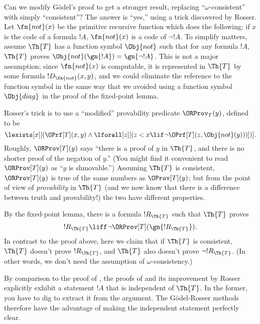 \documentclass[../../include/open-logic-section]{subfiles}
\begin{document}


Can we modify G\"odel's proof to get a stronger result, replacing
``$\omega$-consistent'' with simply ``consistent''? The answer is
``yes,'' using a trick discovered by Rosser. Let $\fn{not}(x)$ be the
primitive recursive function which does the following: if $x$ is the
code of a formula $!A$, $\fn{not}(x)$ is a code of $\lnot !A$.  To
simplify matters, assume $\Th{T}$ has a function symbol $\Obj{not}$
such that for any formula $!A$, $\Th{T}$ proves $\Obj{not}(\gn{!A}) =
\gn{\lnot !A}$. This is not a major assumption; since $\fn{not}(x)$ is
computable, it is represented in $\Th{T}$ by some formula
$!D_{\fn{not}}(x,y)$, and we could eliminate the reference to the
function symbol in the same way that we avoided using a function
symbol $\Obj{diag}$ in the proof of the fixed-point lemma.

Rosser's trick is to use a ``modified'' provability predicate
$\ORProv_T(y)$, defined to be
\[
\lexists[x][(\OPrf[T](x,y) \land \lforall[z][(z < x \lif \lnot
  \OPrf[T](z,{\Obj{not}}(y)))])].
\]
Roughly, $\ORProv[T](y)$ says ``there is a proof of $y$ in $\Th{T}$,
and there is no shorter proof of the negation of $y$.'' (You might
find it convenient to read $\ORProv[T](y)$ as ``$y$ is shmovable.'')
Assuming $\Th{T}$ is consistent, $\ORProv[T](y)$ is true of the same
numbers as $\OProv[T](y)$; but from the point of view of {\em
  provability} in $\Th{T}$ (and we now know that there is a difference
between truth and provability!) the two have different properties.

By the fixed-point lemma, there is a formula $!R_\Th{T}$ such that $\Th{T}$
proves
\[
!R_\Th{T} \liff \lnot \ORProv[T](\gn{!R_\Th{T}}).
\]
In contrast to the proof above, here we claim that if $\Th{T}$ is
consistent, $\Th{T}$ doesn't prove $!R_\Th{T}$, and $\Th{T}$ also
doesn't prove $\lnot !R_\Th{T}$. (In other words, we don't need the
assumption of $\omega$-consistency.)

\begin{digress}
By comparison to the proof of
, the proofs of
 and its improvement by Rosser
explicitly exhibit a statement $!A$ that is independent of $\Th{T}$.
In the former, you have to dig to extract it from the argument. The
G\"odel-Rosser methods therefore have the advantage of making the
independent statement perfectly clear.
\end{digress}
\end{document}
